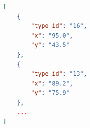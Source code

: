 \begin{lstlisting}[caption=\captionListingText,language=json,xleftmargin=5mm,label=redData] 
[
	{
		"type_id": "16",
		"x": "95.0",
		"y": "43.5"
	},
	{
		"type_id": "13",
		"x": "89.2",
		"y": "75.9"
	},
	...
]
\end{lstlisting}



